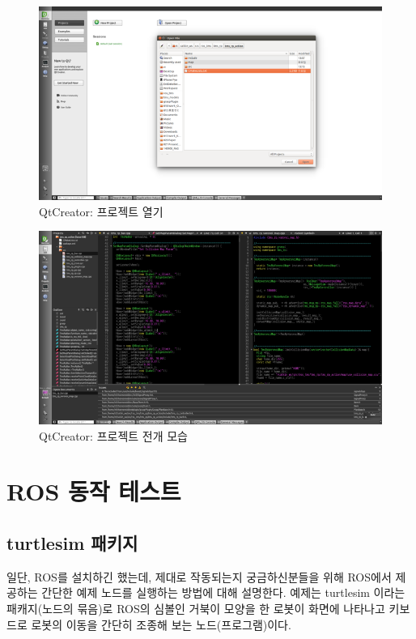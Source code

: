 \begin{figure}[h]
\centering\includegraphics[width=0.9\columnwidth]{pictures/chapter2/qtcreator2.png}
\caption{QtCreator: 프로젝트 열기}
\end{figure}

\begin{figure}[h]
\centering\includegraphics[width=0.9\columnwidth]{pictures/chapter2/qtcreator3.png}
\caption{QtCreator: 프로젝트 전개 모습}
\end{figure}

\section{ROS 동작 테스트}

\subsection{turtlesim 패키지}
일단, ROS를 설치하긴 했는데, 제대로 작동되는지 궁금하신분들을 위해 ROS에서 제공하는 간단한 예제 노드를 실행하는 방법에 대해 설명한다. 예제는 turtlesim 이라는 패캐지(노드의 묶음)로 ROS의 심볼인 거북이 모양을 한 로봇이 화면에 나타나고 키보드로 로봇의 이동을 간단히 조종해 보는 노드(프로그램)이다.

